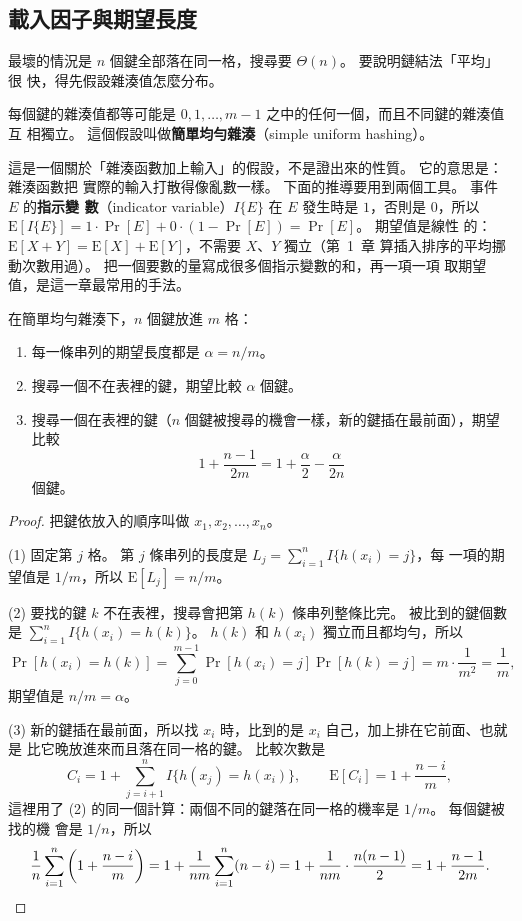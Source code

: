 \subsection{載入因子與期望長度}
\label{sec:hash-chain-analysis}

最壞的情況是 $n$ 個鍵全部落在同一格，搜尋要 $\Theta(n)$。 要說明鏈結法「平均」很
快，得先假設雜湊值怎麼分布。

\begin{definition}[簡單均勻雜湊]
\label{def:hash-suh}
每個鍵的雜湊值都等可能是 $0, 1, \ldots, m-1$ 之中的任何一個，而且不同鍵的雜湊值互
相獨立。 這個假設叫做\textbf{簡單均勻雜湊}（simple uniform hashing）。
\end{definition}

這是一個關於「雜湊函數加上輸入」的假設，不是證出來的性質。 它的意思是：雜湊函數把
實際的輸入打散得像亂數一樣。 下面的推導要用到兩個工具。 事件 $E$ 的\textbf{指示變
數}（indicator variable）$I\{E\}$ 在 $E$ 發生時是 $1$，否則是 $0$，所以
$\mathrm{E}[I\{E\}] = 1 \cdot \Pr[E] + 0 \cdot (1 - \Pr[E]) = \Pr[E]$。 期望值是線性
的：$\mathrm{E}[X + Y] = \mathrm{E}[X] + \mathrm{E}[Y]$，不需要 $X$、$Y$ 獨立（第~1~章
算插入排序的平均挪動次數用過）。 把一個要數的量寫成很多個指示變數的和，再一項一項
取期望值，是這一章最常用的手法。

\begin{theorem}
\label{thm:hash-chain-len}
在簡單均勻雜湊下，$n$ 個鍵放進 $m$ 格：
\begin{enumerate}
\item 每一條串列的期望長度都是 $\alpha = n/m$。
\item 搜尋一個不在表裡的鍵，期望比較 $\alpha$ 個鍵。
\item 搜尋一個在表裡的鍵（$n$ 個鍵被搜尋的機會一樣，新的鍵插在最前面），期望比較
\[
1 + \frac{n - 1}{2m} = 1 + \frac{\alpha}{2} - \frac{\alpha}{2n}
\]
個鍵。
\end{enumerate}
\end{theorem}

\begin{proof}
把鍵依放入的順序叫做 $x_1, x_2, \ldots, x_n$。

(1) 固定第 $j$ 格。 第 $j$ 條串列的長度是 $L_j = \sum_{i=1}^{n} I\{h(x_i) = j\}$，每
一項的期望值是 $1/m$，所以 $\mathrm{E}[L_j] = n/m$。

(2) 要找的鍵 $k$ 不在表裡，搜尋會把第 $h(k)$ 條串列整條比完。 被比到的鍵個數是
$\sum_{i=1}^{n} I\{h(x_i) = h(k)\}$。 $h(k)$ 和 $h(x_i)$ 獨立而且都均勻，所以
\[
\Pr[h(x_i) = h(k)] = \sum_{j=0}^{m-1} \Pr[h(x_i) = j] \Pr[h(k) = j]
= m \cdot \frac{1}{m^2} = \frac{1}{m},
\]
期望值是 $n/m = \alpha$。

(3) 新的鍵插在最前面，所以找 $x_i$ 時，比到的是 $x_i$ 自己，加上排在它前面、也就是
比它晚放進來而且落在同一格的鍵。 比較次數是
\[
C_i = 1 + \sum_{j = i+1}^{n} I\{h(x_j) = h(x_i)\}, \qquad
\mathrm{E}[C_i] = 1 + \frac{n - i}{m},
\]
這裡用了 (2) 的同一個計算：兩個不同的鍵落在同一格的機率是 $1/m$。 每個鍵被找的機
會是 $1/n$，所以
\[
\frac{1}{n} \sum_{i=1}^{n} \left(1 + \frac{n - i}{m}\right)
= 1 + \frac{1}{nm} \sum_{i=1}^{n} (n - i)
= 1 + \frac{1}{nm} \cdot \frac{n(n-1)}{2}
= 1 + \frac{n-1}{2m}. \qedhere
\]
\end{proof}

